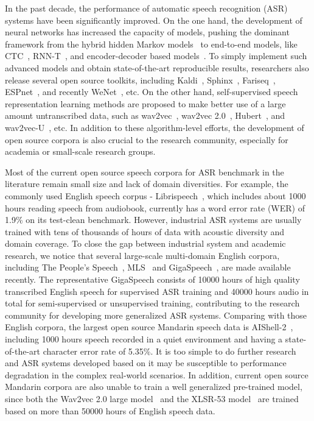 \documentclass{article}
\begin{document}
In the past decade, the performance of automatic speech recognition (ASR) systems have been significantly improved. On the one hand, the development of neural networks has increased the capacity of models, pushing the dominant framework from the hybrid hidden Markov models~\cite{hinton2012deep,dahl2012context} to end-to-end models, like CTC~\cite{graves2006connectionist,amodei2016deep}, RNN-T~\cite{graves2012sequence,graves2013speech,wang2021cascade,wang2021efficient}, and encoder-decoder based models~\cite{chorowski2015attention,chan2016listen,kim2017joint,dong2018speech,gulati2020conformer}. To simply implement such advanced models and obtain state-of-the-art reproducible results, researchers also release several open source toolkits, including Kaldi~\cite{povey2011kaldi}, Sphinx~\cite{lee1990overview}, Fariseq~\cite{ott2019fairseq}, ESPnet~\cite{watanabe2018espnet}, and recently WeNet~\cite{yao2021wenet}, etc. On the other hand, self-supervised speech representation learning methods are proposed to make better use of a large amount untranscribed data, such as wav2vec~\cite{schneider2019wav2vec}, wav2vec 2.0~\cite{baevski2020wav2vec}, Hubert~\cite{hsu2021hubert}, and wav2vec-U~\cite{baevski2021unsupervised}, etc. In addition to these algorithm-level efforts, the development of open source corpora is also crucial to the research community, especially for academia or small-scale research groups.

Most of the current open source speech corpora for ASR benchmark in the literature remain small size and lack of domain diversities. For example, the commonly used English speech corpus - Librispeech~\cite{panayotov2015librispeech}, which includes about 1000 hours reading speech from audiobook, currently has a word error rate (WER) of 1.9\% on its test-clean benchmark. However, industrial ASR systems are usually trained with tens of thousands of hours of data with acoustic diversity and domain coverage.
To close the gap between industrial system and academic research, we notice that several large-scale multi-domain English corpora, including The People's Speech~\cite{galvez2021the}, MLS~\cite{pratap20_interspeech} and GigaSpeech~\cite{chen21o_interspeech}, are made available recently. The representative GigaSpeech
consists of 10000 hours of high quality transcribed English speech for supervised ASR training and 40000 hours audio in total for semi-supervised or unsupervised training, contributing to the research community for developing more generalized ASR systems.
Comparing with those English corpora, the largest open source Mandarin speech data is AIShell-2~\cite{du2018aishell}, including 1000 hours speech recorded in a quiet environment and having a state-of-the-art character error rate of 5.35\%. It is too simple to do further research and ASR systems developed based on it may be susceptible to performance degradation in the complex real-world scenarios. In addition, current open source Mandarin corpora are also unable to train a well generalized pre-trained model, since both the Wav2vec 2.0 large model~\cite{baevski2020wav2vec} and the XLSR-53 model~\cite{conneau2020unsupervised} are trained based on more than 50000 hours of English speech data.
\end{document}
